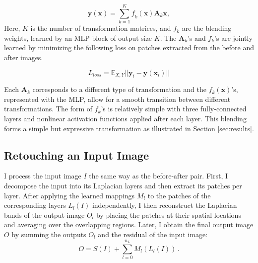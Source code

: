 \begin{equation} 
	\mathbf{y} (\mathbf{x}) = \sum_{k=1}^K
	\mathit{f}_k (\mathbf{x}) \mathbf{A}_k \mathbf{x},
	\label{eq:weightedSum}
\end{equation} 
Here, $K$ is the number of transformation matrices, and $f_k$ are the blending weights, learned by an MLP block of output size $K$. The $\mathbf{A}_k$'s and $f_k$'s are jointly learned by minimizing the following loss on patches extracted from the before and after images.

\begin{equation}
    L_{loss}  = \mathbb{E}_{X, Y} || \mathbf{y}_i -   \mathbf{y} (\mathbf{x}_i) ||
\end{equation}

Each $\mathbf{A}_k$ corresponds to a different type of transformation and the $f_k(\mathbf{x})$'s, represented with the MLP, allow for a smooth transition between different transformations. The form of $f_k$'s is relatively simple with three fully-connected layers and nonlinear activation functions applied after each layer. This blending forms a simple but expressive transformation as illustrated in Section \ref{sec:results}.

\subsection{Retouching an Input Image}

I process the input image $I$ the same way as the before-after pair. First, I decompose the input into its Laplacian layers and then extract its patches per layer. After applying the learned mappings $M_l$ to the patches of the corresponding layers $L_{l}(I)$ independently, I then reconstruct the Laplacian bands of the output image $O_l$ by placing the patches at their spatial locations and averaging over the overlapping regions. Later, I obtain the final output image $O$ by summing the outputs $O_l$ and the residual of the input image:
\begin{equation}
    O = S(I) + \sum_{l=0}^{n_L} M_l(L_l(I))\,.
\end{equation}
